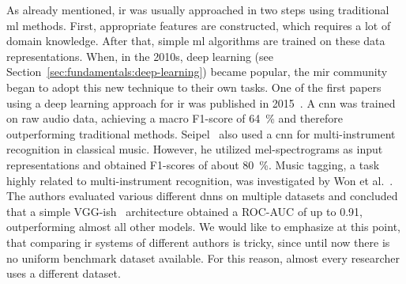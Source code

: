 As already mentioned, \gls{ir} was usually approached in two steps using traditional \gls{ml} methods. First, appropriate features are constructed, which requires a lot of domain knowledge. After that, simple \gls{ml} algorithms are trained on these data representations. When, in the 2010s, deep learning (see Section~\ref{sec:fundamentals:deep-learning}) became popular, the \gls{mir} community began to adopt this new technique to their own tasks. One of the first papers using a deep learning approach for \gls{ir} was published in 2015~\cite{li2015automatic}. A \gls{cnn} was trained on raw audio data, achieving a macro F1-score of \SI{64}{\percent} and therefore outperforming traditional methods. Seipel~\cite{seipel2018music} also used a \gls{cnn} for multi-instrument recognition in classical music. However, he utilized mel-spectrograms as input representations and obtained F1-scores of about \SI{80}{\percent}. Music tagging, a task highly related to multi-instrument recognition, was investigated by Won et al.~\cite{won2020evaluation}. The authors evaluated various different \glspl{dnn} on multiple datasets and concluded that a simple VGG-ish~\cite{simonyan2014very} architecture obtained a ROC-AUC of up to 0.91, outperforming almost all other models. We would like to emphasize at this point, that comparing \gls{ir} systems of different authors is tricky, since until now there is no uniform benchmark dataset available. For this reason, almost every researcher uses a different dataset.